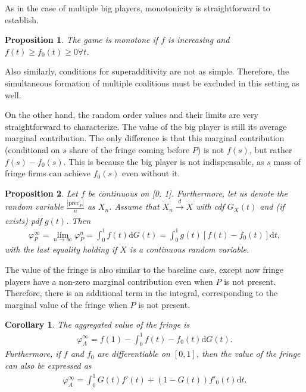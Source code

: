\documentclass[a4paper]{article}
\newtheorem{proposition}{Proposition}
\newtheorem{corollary}{Corollary}
\newcommand{\dt}{\mathrm{d}t}
\newcommand{\dG}{\mathrm{d}G}
\newcommand{\precede}{\mathrm{prec}}
\begin{document}
As in the case of multiple big players, monotonicity is straightforward to establish.
\begin{proposition}
    The game is monotone if $f$ is increasing and $f(t) \geq f_0(t) \geq 0 \forall t$.
\end{proposition}
Also similarly, conditions for superadditivity are not as simple.
Therefore, the simultaneous formation of multiple coalitions must be excluded in this setting as well.

On the other hand, the random order values and their limits are very straightforward to characterize.
The value of the big player is still its average marginal contribution.
The only difference is that this marginal contribution (conditional on $s$ share of the fringe coming before $P$) is not $f(s)$, but rather $f(s) - f_0(s)$.
This is because the big player is not indispensable, as $s$ mass of fringe firms can achieve $f_0(s)$ even without it.

\begin{proposition}
    \label{prop:one_sided_non_indispensable}
    Let $f$ be continuous on [0, 1]. Furthermore, let us denote the random variable $\frac{|\precede_P|}{n}$ as $X_n$. Assume that $X_n \xrightarrow[]{d} X$ with cdf $G_X(t)$ and (if exists) pdf $g(t)$.
    Then
    \begin{align*}
        \varphi_P^\infty = \lim_{n \to \infty} \varphi_P^n = \int_0^1 f(t) \dG(t) = \int_0^1 g(t) [f(t) - f_0(t)] \dt,
    \end{align*}
    with the last equality holding if $X$ is a continuous random variable.
\end{proposition}

The value of the fringe is also similar to the baseline case, except now fringe players have a non-zero marginal contribution even when $P$ is not present.
Therefore, there is an additional term in the integral, corresponding to the marginal value of the fringe when $P$ is not present.

\begin{corollary}
    \label{cor:fringe_value_non_indispensable}
    The aggregated value of the fringe is
    \begin{align*}
        \varphi_A^\infty = f(1) - \int_0^1 f(t) - f_0(t) \dG(t).
    \end{align*}
    Furthermore, if $f$ and $f_0$ are differentiable on $[0, 1]$, then the value of the fringe can also be expressed as
    \begin{align*}
        \varphi_A^\infty = \int_0^1 G(t) f'(t) + (1 - G(t)) f'_0(t) \dt.
    \end{align*}
\end{corollary}
\end{document}
